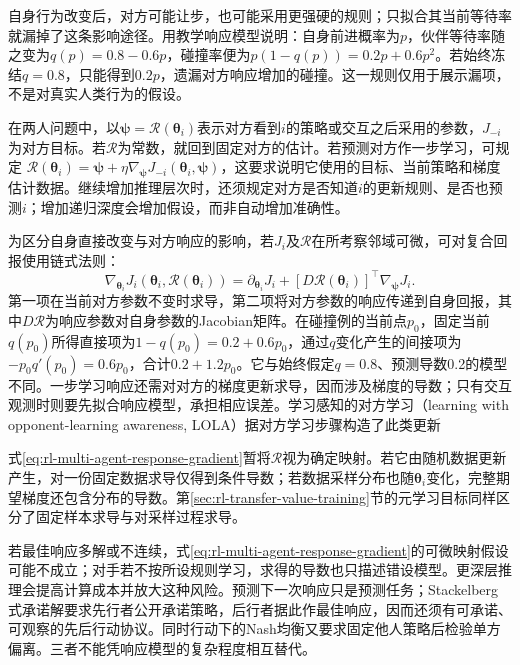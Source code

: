 自身行为改变后，对方可能让步，也可能采用更强硬的规则；只拟合其当前等待率就漏掉了这条影响途径。用教学响应模型说明：自身前进概率为$p$，伙伴等待率随之变为$q(p)=0.8-0.6p$，碰撞率便为$p(1-q(p))=0.2p+0.6p^2$。若始终冻结$q=0.8$，只能得到$0.2p$，遗漏对方响应增加的碰撞。这一规则仅用于展示漏项，不是对真实人类行为的假设。

在两人问题中，以$\bm\psi=\mathcal R(\bm\theta_i)$表示对方看到$i$的策略或交互之后采用的参数，$J_{-i}$为对方目标。若$\mathcal R$为常数，就回到固定对方的估计。若预测对方作一步学习，可规定
$\mathcal R(\bm\theta_i)=\bm\psi+\eta\nabla_{\bm\psi}J_{-i}(\bm\theta_i,\bm\psi)$，这要求说明它使用的目标、当前策略和梯度估计数据。继续增加推理层次时，还须规定对方是否知道$i$的更新规则、是否也预测$i$；增加递归深度会增加假设，而非自动增加准确性。

为区分自身直接改变与对方响应的影响，若$J_i$及$\mathcal R$在所考察邻域可微，可对复合回报使用链式法则：
\begin{equation}
 \nabla_{\bm\theta_i}J_i(\bm\theta_i,\mathcal R(\bm\theta_i))
 =
 \partial_{\bm\theta_i}J_i+
 [D\mathcal R(\bm\theta_i)]^\top
       \nabla_{\bm\psi}J_i.
 \label{eq:rl-multi-agent-response-gradient}
\end{equation}
第一项在当前对方参数不变时求导，第二项将对方参数的响应传递到自身回报，其中$D\mathcal R$为响应参数对自身参数的Jacobian矩阵。在碰撞例的当前点$p_0$，固定当前$q(p_0)$所得直接项为$1-q(p_0)=0.2+0.6p_0$，通过$q$变化产生的间接项为$-p_0q'(p_0)=0.6p_0$，合计$0.2+1.2p_0$。它与始终假定$q=0.8$、预测导数0.2的模型不同。一步学习响应还需对对方的梯度更新求导，因而涉及梯度的导数；只有交互观测时则要先拟合响应模型，承担相应误差。学习感知的对方学习（learning with opponent-learning awareness, LOLA）据对方学习步骤构造了此类更新

式\eqref{eq:rl-multi-agent-response-gradient}暂将$\mathcal R$视为确定映射。若它由随机数据更新产生，对一份固定数据求导仅得到条件导数；若数据采样分布也随$\bm\theta_i$变化，完整期望梯度还包含分布的导数。第\ref{sec:rl-transfer-value-training}节的元学习目标同样区分了固定样本求导与对采样过程求导。

若最佳响应多解或不连续，式\eqref{eq:rl-multi-agent-response-gradient}的可微映射假设可能不成立；对手若不按所设规则学习，求得的导数也只描述错设模型。更深层推理会提高计算成本并放大这种风险。预测下一次响应只是预测任务；Stackelberg式承诺解要求先行者公开承诺策略，后行者据此作最佳响应，因而还须有可承诺、可观察的先后行动协议。同时行动下的Nash均衡又要求固定他人策略后检验单方偏离。三者不能凭响应模型的复杂程度相互替代。

